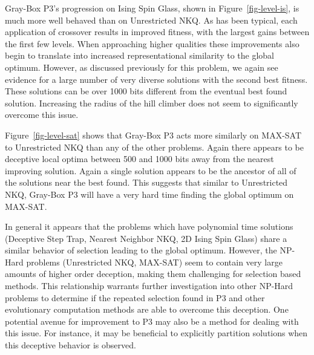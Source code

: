\begin{figure*}
  \centering
  \caption{Distribution of local optima stored at each level of Gray-Box P3 in relation to the best found by the run on an Ising Spin Glass
           $N=6084$.}
  \label{fig-level-is}
\end{figure*}

Gray-Box P3's progression on Ising Spin Glass, shown in Figure~\ref{fig-level-is}, is much more well behaved than on Unrestricted
NKQ. As has been typical, each application of crossover results in improved fitness, with the largest gains between the first few levels.
When approaching higher qualities these improvements also begin to translate into increased representational similarity to the global optimum.
However, as discussed previously for this problem, we again see evidence for a large number of very diverse solutions with the second best
fitness. These solutions can be over 1000 bits different from the eventual best found solution. Increasing the radius of the hill climber
does not seem to significantly overcome this issue.

\begin{figure*}
  \centering
  \caption{Distribution of local optima stored at each level of Gray-Box P3 in relation to the best found by the run on
           a MAX-SAT problem $N=6000$.}
  \label{fig-level-sat}
\end{figure*}

Figure~\ref{fig-level-sat} shows that Gray-Box P3 acts more similarly on MAX-SAT to Unrestricted NKQ than any of the other problems. Again there
appears to be deceptive local optima between 500 and 1000 bits away from the nearest improving solution. Again a single solution appears
to be the ancestor of all of the solutions near the best found. This suggests that similar to Unrestricted NKQ, Gray-Box P3 will have a
very hard time finding the global optimum on MAX-SAT.

In general it appears that the problems which have polynomial time solutions (Deceptive Step Trap, Nearest Neighbor NKQ, 2D Ising Spin Glass)
share a similar behavior of selection leading to the global optimum. However, the NP-Hard problems (Unrestricted NKQ, MAX-SAT) seem to contain
very large amounts of higher order deception, making them challenging for selection based methods. This relationship warrants further investigation
into other NP-Hard problems to determine if the repeated selection found in P3 and other evolutionary computation methods are able to overcome
this deception. One potential avenue for improvement to P3 may also be a method for dealing with this issue. For instance, it may be beneficial to
explicitly partition solutions when this deceptive behavior is observed.

